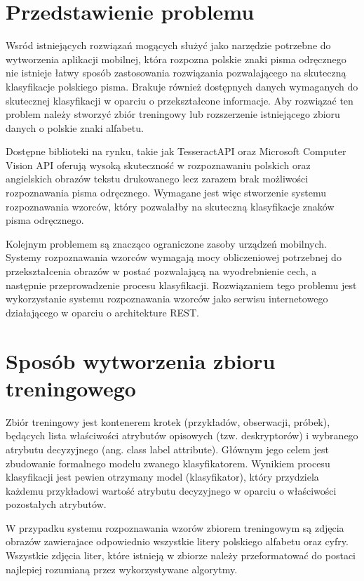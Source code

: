 \documentclass[brudnopis]{xmgr}
\begin{document}
\section{Przedstawienie problemu}

Wsród istniejących rozwiązań mogących służyć jako narzędzie potrzebne do wytworzenia aplikacji mobilnej, która rozpozna polskie znaki pisma odręcznego nie istnieje łatwy sposób zastosowania rozwiązania pozwalającego na skuteczną klasyfikacje polskiego pisma. Brakuje również dostępnych danych wymaganych do skutecznej klasyfikacji w oparciu o przekształcone informacje. Aby rozwiązać ten problem należy stworzyć zbiór treningowy lub rozszerzenie istniejącego zbioru danych o polskie znaki alfabetu.

Dostępne biblioteki na rynku, takie jak TesseractAPI oraz Microsoft Computer Vision API oferują wysoką skuteczność w rozpoznawaniu polskich oraz angielskich obrazów tekstu drukowanego lecz zarazem brak możliwości rozpoznawania pisma odręcznego. Wymagane jest więc stworzenie systemu rozpoznawania wzorców, który pozwalałby na skuteczną klasyfikacje znaków pisma odręcznego.

Kolejnym problemem są znacząco ograniczone zasoby urządzeń mobilnych. Systemy rozpoznawania wzorców wymagają mocy obliczeniowej potrzebnej do przekształcenia obrazów w postać pozwalającą na wyodrebnienie cech, a następnie przeprowadzenie procesu klasyfikacji. Rozwiązaniem tego problemu jest wykorzystanie systemu rozpoznawania wzorców jako serwisu internetowego działającego w oparciu o architekture REST.

\section{Sposób wytworzenia zbioru treningowego}

Zbiór treningowy jest kontenerem krotek (przykładów, obserwacji, próbek), będących lista właściwości atrybutów opisowych (tzw. deskryptorów) i wybranego atrybutu decyzyjnego (ang. class label attribute). Głównym jego celem jest zbudowanie formalnego modelu zwanego klasyfikatorem. Wynikiem procesu klasyfikacji jest pewien otrzymany model (klasyfikator), który przydziela każdemu przykładowi wartość atrybutu decyzyjnego w oparciu o właściwości pozostałych atrybutów.

W przypadku systemu rozpoznawania wzorów zbiorem treningowym są zdjęcia obrazów zawierajace odpowiednio wszystkie litery polskiego alfabetu oraz cyfry. Wszystkie zdjęcia liter, które istnieją w zbiorze należy przeformatować do postaci najlepiej rozumianą przez wykorzystywane algorytmy.
\end{document}

